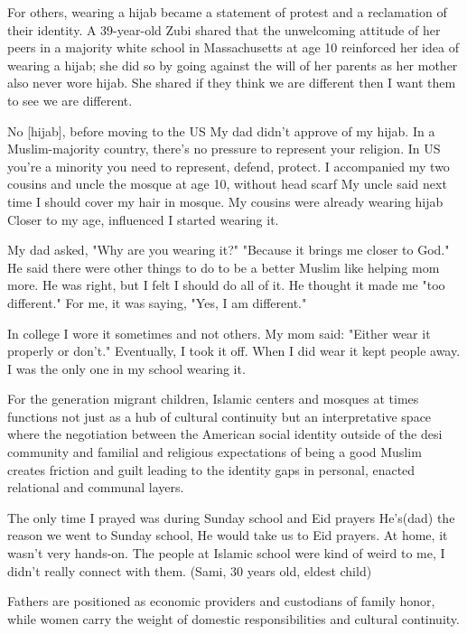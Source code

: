 For others, wearing a hijab became a statement of protest and a reclamation of their identity. A 39-year-old Zubi shared that the unwelcoming attitude of her peers in a majority white school in Massachusetts at age 10 reinforced her idea of wearing a hijab; she did so by going against the will of her parents as her mother also never wore hijab. She shared if they think we are different then I want them to see we are different.

\begin{FoundPoem}
No [hijab], before moving to the US
My dad didn’t approve of my hijab.
In a Muslim-majority country,
there’s no pressure to represent your religion.
In US  you’re a minority
you need to represent, defend, protect.
I accompanied my two cousins and uncle
the mosque at age 10, without head scarf
My uncle said next time I should cover my hair in mosque.
My cousins were already wearing hijab
Closer to my age,
 influenced
I started wearing it.

My dad asked, "Why are you wearing it?"
"Because it brings me closer to God."
He said there were other things to do
to be a better Muslim 
like helping  mom more.
He was right,
but I felt I should do all of it.
 He thought it made me "too different."
 For me, it was saying, "Yes, I am different."

In college I wore it sometimes and not others.
 My mom said: "Either wear it properly or don’t."
 Eventually, I took it off.
  When I did wear it
   kept people away.
  I was the only one in my school wearing it.
\end{FoundPoem}

For the generation migrant children, Islamic centers and mosques at times functions not just as a hub of cultural continuity but an interpretative space where the negotiation between the American social identity outside of the desi community and familial and  religious expectations of being a good Muslim creates friction and guilt leading to the identity gaps in personal, enacted relational and communal layers.

\begin{FoundPoem}
The only time I prayed was during Sunday school and Eid prayers
He’s(dad) the reason we went to Sunday school, 
He would take us to Eid prayers. 
At home, it wasn’t very hands-on.
The people at Islamic school were kind of weird to me, 
I didn’t really connect with them. (Sami, 30 years old, eldest child)
\end{FoundPoem}

Fathers are positioned as economic providers and custodians of family honor, while women carry the weight of domestic responsibilities and cultural continuity.

